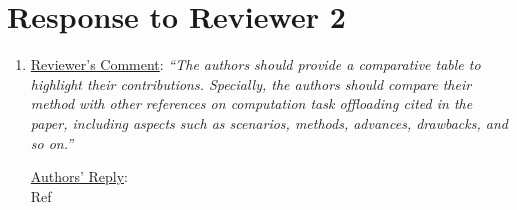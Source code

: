\documentclass[12pt,draftclsnofoot,onecolumn]{IEEEtran}
\begin{document}
\section{Response to Reviewer 2}
\begin{enumerate}
	
	\item \underline{Reviewer's Comment}: 
	\textit{``The authors should provide a comparative table to highlight their contributions. Specially, the authors should compare their method with other references on computation task offloading cited in the paper, including aspects such as scenarios, methods, advances, drawbacks, and so on.''} \newline
	
	
	\underline{Authors' Reply}:\\
	Ref
	

\end{enumerate}
\end{document}

